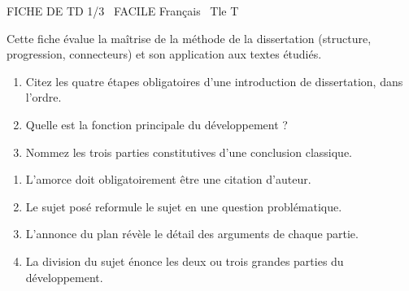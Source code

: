 \documentclass[11pt]{article}
\begin{document}
\begin{tcolorbox}[enhanced,colback=popink,colframe=popink,arc=10pt,boxrule=0pt,left=12pt,right=12pt,top=9pt,bottom=9pt]
{\color{white}\popxbold\small FICHE DE TD 1/3 \textbullet\ FACILE \hfill Français \textbullet\ Tle T\par}
\end{tcolorbox}
\vspace{4pt}
Cette fiche évalue la maîtrise de la méthode de la dissertation (structure, progression, connecteurs) et son application aux textes étudiés.

\begin{exercice}
\begin{enumerate}
    \item Citez les quatre étapes obligatoires d'une introduction de dissertation, dans l'ordre.
    \item Quelle est la fonction principale du développement ?
    \item Nommez les trois parties constitutives d'une conclusion classique.
\end{enumerate}
\end{exercice}

\begin{exercice}
\begin{enumerate}
    \item L'amorce doit obligatoirement être une citation d'auteur.
    \item Le sujet posé reformule le sujet en une question problématique.
    \item L'annonce du plan révèle le détail des arguments de chaque partie.
    \item La division du sujet énonce les deux ou trois grandes parties du développement.
\end{enumerate}
\end{exercice}
\end{document}
